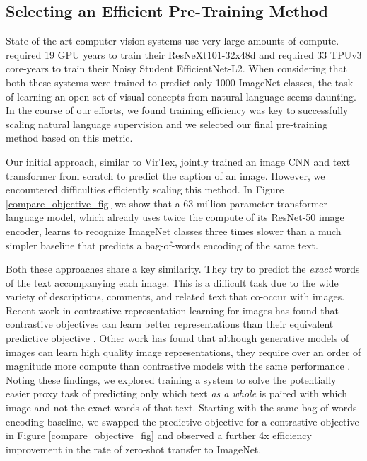 \documentclass{article}
\begin{document}
\subsection{Selecting an Efficient Pre-Training Method}
\label{subsection:method}


State-of-the-art computer vision systems use very large amounts of compute. \citet{mahajan2018exploring} required 19 GPU years to train their ResNeXt101-32x48d and \citet{xie2020self} required 33 TPUv3 core-years to train their Noisy Student EfficientNet-L2. When considering that both these systems were trained to predict only 1000 ImageNet classes, the task of learning an open set of visual concepts from natural language seems daunting. In the course of our efforts, we found training efficiency was key to successfully scaling natural language supervision and we selected our final pre-training method based on this metric.




Our initial approach, similar to VirTex, jointly trained an image CNN and text transformer from scratch to predict the caption of an image. However, we encountered difficulties efficiently scaling this method. In Figure \ref{compare_objective_fig} we show that a 63 million parameter transformer language model, which already uses twice the compute of its ResNet-50 image encoder, learns to recognize ImageNet classes three times slower than a much simpler baseline that predicts a bag-of-words encoding of the same text.





Both these approaches share a key similarity. They try to predict the \textit{exact} words of the text accompanying each image. This is a difficult task due to the wide variety of descriptions, comments, and related text that co-occur with images. Recent work in contrastive representation learning for images has found that contrastive objectives can learn better representations than their equivalent predictive objective \citep{tian2019contrastive}. Other work has found that although generative models of images can learn high quality image representations, they require over an order of magnitude more compute than contrastive models with the same performance \citep{chen2020generative}. Noting these findings, we explored training a system to solve the potentially easier proxy task of predicting only which text \textit{as a whole} is paired with which image and not the exact words of that text. Starting with the same bag-of-words encoding baseline, we swapped the predictive objective for a contrastive objective in Figure \ref{compare_objective_fig} and observed a further 4x efficiency improvement in the rate of zero-shot transfer to ImageNet.
\end{document}
